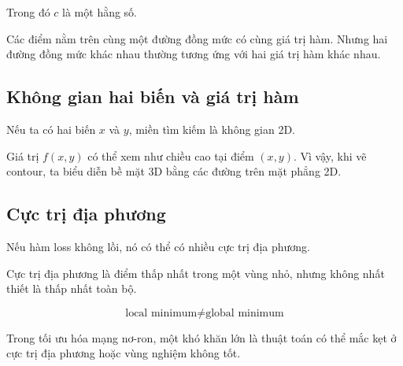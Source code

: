 Trong đó $c$ là một hằng số.

\begin{ghinho}
Các điểm nằm trên cùng một đường đồng mức có cùng giá trị hàm. Nhưng hai đường đồng mức khác nhau thường tương ứng với hai giá trị hàm khác nhau.
\end{ghinho}

\subsection{Không gian hai biến và giá trị hàm}

Nếu ta có hai biến $x$ và $y$, miền tìm kiếm là không gian 2D.

Giá trị $f(x,y)$ có thể xem như chiều cao tại điểm $(x,y)$. Vì vậy, khi vẽ contour, ta biểu diễn bề mặt 3D bằng các đường trên mặt phẳng 2D.

\begin{center}
\end{center}

\subsection{Cực trị địa phương}

Nếu hàm loss không lồi, nó có thể có nhiều cực trị địa phương.

Cực trị địa phương là điểm thấp nhất trong một vùng nhỏ, nhưng không nhất thiết là thấp nhất toàn bộ.

\[
    \text{local minimum} \neq \text{global minimum}
\]

\begin{canhbao}
Trong tối ưu hóa mạng nơ-ron, một khó khăn lớn là thuật toán có thể mắc kẹt ở cực trị địa phương hoặc vùng nghiệm không tốt.
\end{canhbao}

